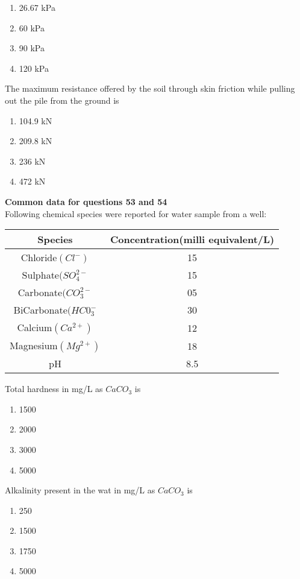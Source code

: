  \begin{enumerate}
     \item 26.67 kPa
     \item 60 kPa
     \item 90 kPa
     \item 120 kPa

 \end{enumerate}
 \item The maximum resistance offered by the soil through skin friction while pulling out the pile from the ground is
 \begin{enumerate}
     \item 104.9 kN
      \item 209.8 kN
     \item 236 kN
     \item 472 kN \\
\end{enumerate}
 \textbf{Common data for questions 53 and 54} \\
 Following chemical species were reported for water sample from a well:
 \begin{table}[H]
  \centering
  \begin{tabular}{c|c}
    \hline
    \textbf{Species} & \textbf{Concentration(milli equivalent/L)}\\
    \hline
    Chloride$(Cl^{-})$ & 15\\
    Sulphate$(SO_{4}^{2-}$ & 15 \\
    Carbonate$(CO_{3}^{2-}$ & 05 \\
    BiCarbonate$(HC0_{3}^{-}$ & 30 \\
    Calcium$(Ca^{2+})$ & 12 \\
    Magnesium$(Mg^{2+})$ & 18 \\ 
    pH & 8.5 \\
    \hline
    \end{tabular}
  \end{table}
  \item Total hardness in mg/L as $CaCO_{3}$  is
  \begin{enumerate}
      \item 1500
      \item 2000
      \item 3000
      \item 5000
  \end{enumerate}
  \item Alkalinity present in the wat in mg/L as $CaCO_{3}$ is 
  \begin{enumerate}
      \item 250
      \item 1500
      \item 1750
      \item 5000 \\
  \end{enumerate}
